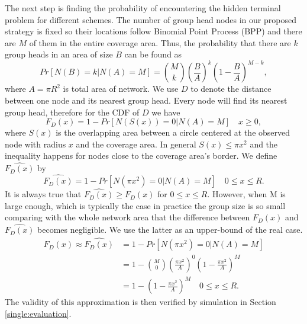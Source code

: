The next step is finding the probability of encountering the hidden terminal problem for different schemes. The number of group head nodes in our proposed strategy is fixed so their locations follow Binomial Point Process (BPP) and there are $M$ of them in the entire coverage area. Thus, the probability that there are $k$ group heads in an area of size $B$ can be found as
\begin{equation}
Pr[ N(B)=k | N(A)=M]={M \choose k} \left( \frac{B}{A} \right)^k \left( 1- \frac{B}{A} \right)^{M-k},
\end{equation}
where $A=\pi R^2$ is total area of network. We use $D$ to denote the distance between one node and its nearest group head. Every node will find its nearest group head, therefore for the CDF of $D$ we have
\begin{equation}
F_D(x)=1-Pr[N(S(x))=0 | N(A)=M] \quad x \geq 0,
\end{equation}
where $S(x)$ is the overlapping area between a circle centered at the observed node with radius $x$ and the coverage area. In general $S(x) \leq \pi x^2$ and the inequality happens for nodes close to the coverage area's border. We define $\hat{F_D(x)}$ by
\begin{equation}
\hat{F_D(x)}=1-Pr[N(\pi x^2)=0 | N(A)=M] \quad 0 \leq x \leq R.
\end{equation}
It is always true that $\hat{F_D(x)} \geq F_D(x)$ for $0 \leq x \leq R$. However, when M is large enough, which is typically the case in practice \cite{zheng2014performance} the group size is so small comparing with the whole network area that the difference between $F_D(x)$ and $\hat{F_D(x)}$ becomes negligible. We use the latter as an upper-bound of the real case.
\begin{equation} \label{eq:cdf}
\begin{split}
F_D(x) \approx \hat{F_D(x)} &=1-Pr[N(\pi x^2)=0 | N(A)=M] \\
&=1- {M \choose 0} \left( \frac{\pi x^2}{A} \right)^0 \left( 1- \frac{\pi x^2}{A} \right)^{M} \\
&=1- \left( 1- \frac{\pi x^2}{A} \right)^{M} \quad 0 \leq x \leq R.
\end{split}
\end{equation}
The validity of this approximation is then verified by simulation in Section \ref{single:evaluation}.

